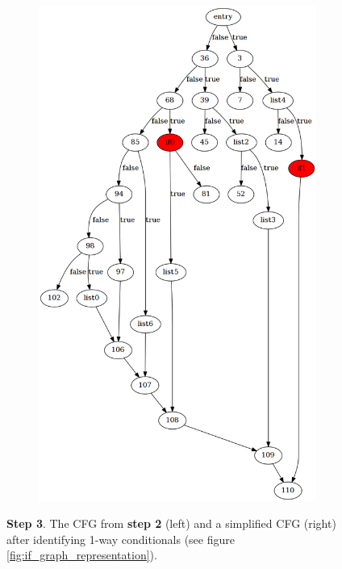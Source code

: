 \begin{figure}[htbp]
\begin{subfigure}[ht]{0.45\textwidth}
		\includegraphics[width=\textwidth]{inc/appendices/control_flow_analysis_example/step3_after.png}
	\end{subfigure}
	\caption{\textbf{Step 3}. The CFG from \textbf{step 2} (left) and a simplified CFG (right) after identifying 1-way conditionals (see figure \ref{fig:if_graph_representation}).}
	\label{fig:step_3}
\end{figure}

